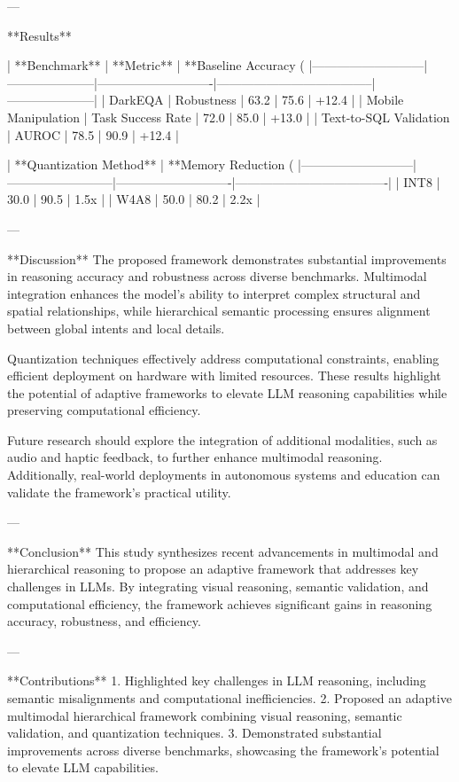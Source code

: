 ---

**Results**  

| **Benchmark**            | **Metric**          | **Baseline Accuracy (%
|---------------------------|---------------------|----------------------------|--------------------------------------|---------------------|  
| DarkEQA                  | Robustness          | 63.2                       | 75.6                                 | +12.4               |  
| Mobile Manipulation       | Task Success Rate   | 72.0                       | 85.0                                 | +13.0               |  
| Text-to-SQL Validation    | AUROC               | 78.5                       | 90.9                                 | +12.4               |  

| **Quantization Method**  | **Memory Reduction (%
|---------------------------|--------------------------|----------------------------|-------------------------------------|  
| INT8                     | 30.0                     | 90.5                       | 1.5x                                |  
| W4A8                     | 50.0                     | 80.2                       | 2.2x                                |  

---

**Discussion**  
The proposed framework demonstrates substantial improvements in reasoning accuracy and robustness across diverse benchmarks. Multimodal integration enhances the model's ability to interpret complex structural and spatial relationships, while hierarchical semantic processing ensures alignment between global intents and local details.  

Quantization techniques effectively address computational constraints, enabling efficient deployment on hardware with limited resources. These results highlight the potential of adaptive frameworks to elevate LLM reasoning capabilities while preserving computational efficiency.  

Future research should explore the integration of additional modalities, such as audio and haptic feedback, to further enhance multimodal reasoning. Additionally, real-world deployments in autonomous systems and education can validate the framework's practical utility.  

---

**Conclusion**  
This study synthesizes recent advancements in multimodal and hierarchical reasoning to propose an adaptive framework that addresses key challenges in LLMs. By integrating visual reasoning, semantic validation, and computational efficiency, the framework achieves significant gains in reasoning accuracy, robustness, and efficiency.  

---

**Contributions**  
1. Highlighted key challenges in LLM reasoning, including semantic misalignments and computational inefficiencies.  
2. Proposed an adaptive multimodal hierarchical framework combining visual reasoning, semantic validation, and quantization techniques.  
3. Demonstrated substantial improvements across diverse benchmarks, showcasing the framework's potential to elevate LLM capabilities.  